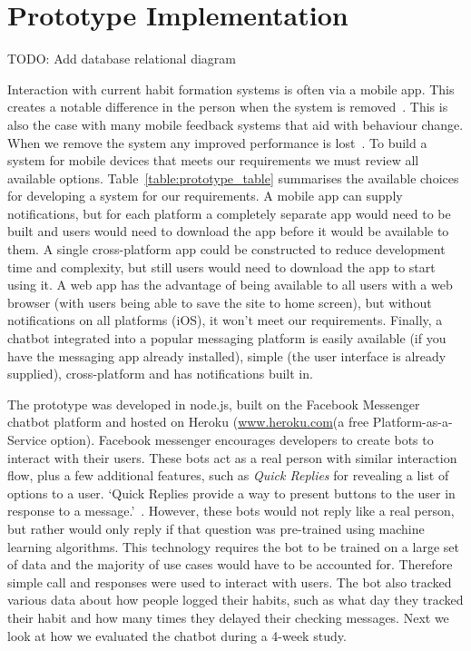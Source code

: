 
\section{Prototype Implementation}

TODO: Add database relational diagram

Interaction with current habit formation systems is often via a mobile app. This creates a notable difference in the person when the system is removed~\cite{article_my_phone_is_part_of_my_soul}.
This is also the case with many mobile feedback systems that aid with behaviour change.
When we remove the system any improved performance is lost~\cite{article_dont_kick_habit, article_realtime_feedback_improving_medication_taking}. To build a system for mobile devices that meets our requirements we must review all available options.\newline
\newline
Table~\ref{table:prototype_table} summarises the available choices for developing a system for our requirements. A mobile app can supply notifications, but for each platform a completely separate app would need to be built and users would need to download the app before it would be available to them.\newline
A single cross-platform app could be constructed to reduce development time and complexity, but still users would need to download the app to start using it.\newline
A web app has the advantage of being available to all users with a web browser (with users being able to save the site to home screen), but without notifications on all platforms (iOS), it won't meet our requirements.\newline
Finally, a chatbot integrated into a popular messaging platform is easily available (if you have the messaging app already installed), simple (the user interface is already supplied), cross-platform and has notifications built in.


The prototype was developed in node.js, built on the Facebook Messenger chatbot platform and hosted on Heroku (\url{www.heroku.com}(a free Platform-as-a-Service option). Facebook messenger encourages developers to create bots to interact with their users. These bots act as a real person with similar interaction flow, plus a few additional features, such as \textit{Quick Replies} for revealing a list of options to a user. `Quick Replies provide a way to present buttons to the user in response to a message.'~\cite{doc_fb_quick_replies}. However, these bots would not reply like a real person, but rather would only reply if that question was pre-trained using machine learning algorithms. This technology requires the bot to be trained on a large set of data and the majority of use cases would have to be accounted for. Therefore simple call and responses were used to interact with users. The bot also tracked various data about how people logged their habits, such as what day they tracked their habit and how many times they delayed their checking messages. Next we look at how we evaluated the chatbot during a 4-week study.

